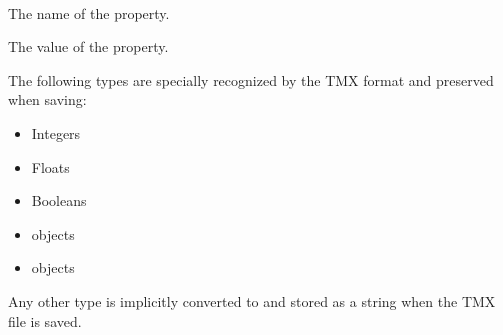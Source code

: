\documentclass[letterpaper,10pt,english]{sphinxmanual}
\begin{document}
\begin{fulllineitems}
\label{index:tmx.Property}~

\begin{fulllineitems}
\label{index:tmx.Property.name}
The name of the property.

\end{fulllineitems}


\begin{fulllineitems}
\label{index:tmx.Property.value}
The value of the property.

The following types are specially recognized by the TMX format
and preserved when saving:
\begin{itemize}
\item {} 
Integers

\item {} 
Floats

\item {} 
Booleans

\item {} 
{\hyperref[index:tmx.Color]{\emph{}}} objects

\item {} 
 objects

\end{itemize}

Any other type is implicitly converted to and stored as a string
when the TMX file is saved.

\end{fulllineitems}


\end{fulllineitems}

\end{document}
